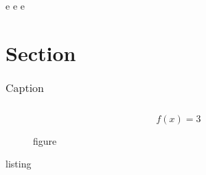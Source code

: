 \newpage e
\newpage e
\newpage e 


\section{Section}
\label{section}

\begin{table}[]
    \centering
    \begin{tabular}{l}
          
    \end{tabular}
    \caption{Caption}
    \label{tableau}
\end{table}


\begin{equation} \label{equat}
f(x) = 3
\end{equation}

\begin{figure}
	\caption{figure}
	\label{figure}
\end{figure}


\begin{listing}
	\caption{listing}
	\label{listing}
\end{listing}